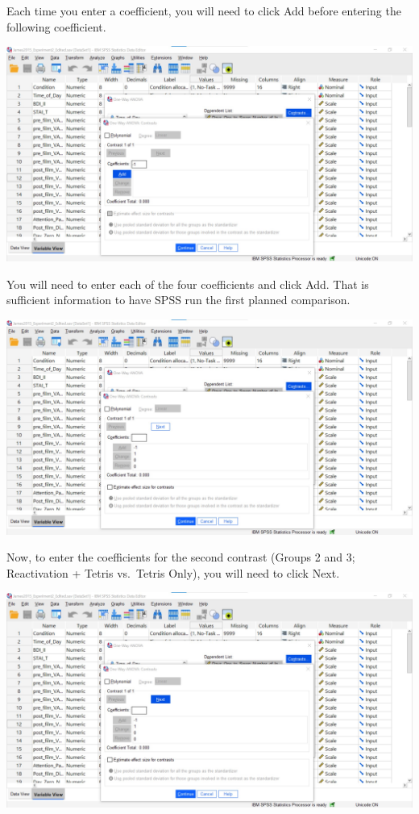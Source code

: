 \documentclass[
]{book}
\begin{document}
Each time you enter a coefficient, you will need to click {Add} before entering the following coefficient.

\includegraphics{img/8.6.4.26.png}

You will need to enter each of the four coefficients and click {Add}. That is sufficient information to have SPSS run the first planned comparison.

\includegraphics{img/8.6.4.27.png}

Now, to enter the coefficients for the second contrast (Groups 2 and 3; Reactivation + Tetris vs.~Tetris Only), you will need to click {Next}.

\includegraphics{img/8.6.4.28.png}
\end{document}
